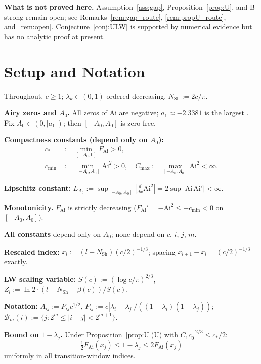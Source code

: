 \documentclass[12pt]{amsart}
\theoremstyle{definition}
\theoremstyle{remark}
\newcommand{\FAi}{F_{\mathrm{Ai}}}
\newcommand{\NSh}{N_{\mathrm{Sh}}}
\newcommand{\Bm}{\mathcal{B}_m}
\begin{document}
\medskip\noindent
\textbf{What is not proved here.}
Assumption~\ref{ass:gap}, Proposition~\ref{prop:U},
and B-strong remain open;
see Remarks~\ref{rem:gap_route}, \ref{rem:propU_route},
and~\ref{rem:open}.
Conjecture~\ref{conj:ULW} is supported by numerical
evidence but has no analytic proof at present.

\section{Setup and Notation}
\label{sec:setup}

Throughout, $c \ge 1$; $\lambda_k \in (0,1)$ ordered
decreasing. $\NSh := 2c/\pi$.

\medskip\noindent
\textbf{Airy zeros and $A_0$.}
All zeros of $\mathrm{Ai}$ are negative;
$a_1 \approx -2.3381$ is the largest \cite[Sec.~9.9]{DLMF}.
Fix $A_0 \in (0,|a_1|)$; then $[-A_0,A_0]$ is zero-free.

\medskip\noindent
\textbf{Compactness constants (depend only on $A_0$):}
\begin{align*}
  c_* &:= \min_{[-A_0,0]}\FAi > 0,\\
  c_{\min} &:= \min_{[-A_0,A_0]}\mathrm{Ai}^2 > 0,\quad
  C_{\max} := \max_{[-A_0,A_0]}\mathrm{Ai}^2 < \infty.
\end{align*}

\medskip\noindent
\textbf{Lipschitz constant:}
$L_{A_0} := \sup_{[-A_0,A_0]}|\frac{d}{dx}\mathrm{Ai}^2|
= 2\sup|\mathrm{Ai}\,\mathrm{Ai}'| < \infty.$

\medskip\noindent
\textbf{Monotonicity.}
$\FAi$ is strictly decreasing
($\FAi' = -\mathrm{Ai}^2 \le -c_{\min} < 0$ on $[-A_0,A_0]$).

\medskip\noindent
\textbf{All constants} depend only on $A_0$; none
depend on $c$, $i$, $j$, $m$.

\medskip\noindent
\textbf{Rescaled index:}
$x_l := (l-\NSh)(c/2)^{-1/3}$;
spacing $x_{l+1}-x_l = (c/2)^{-1/3}$ exactly.

\medskip\noindent
\textbf{LW scaling variable:}
$S(c) := (\log c/\pi)^{2/3}$,\quad
$Z_l := \ln 2 \cdot (l - \NSh - \beta(c))/S(c)$.

\medskip\noindent
\textbf{Notation:}
$A_{ij} := P_{ij}c^{1/2}$,\;
$P_{ij} := c|\lambda_i-\lambda_j|/
((1-\lambda_i)(1-\lambda_j))$;\;
$\Bm(i) := \{j: 2^m \le |i-j| < 2^{m+1}\}$.

\medskip\noindent
\textbf{Bound on $1-\lambda_j$.}
Under Proposition~\ref{prop:U}\textup{(U)}
with $C_1 c_0^{-2/3} \le c_*/2$:
\begin{equation}\label{eq:onemlam}
  \tfrac{1}{2}\FAi(x_j) \le 1-\lambda_j \le 2\FAi(x_j)
\end{equation}
uniformly in all transition-window indices.
\end{document}
